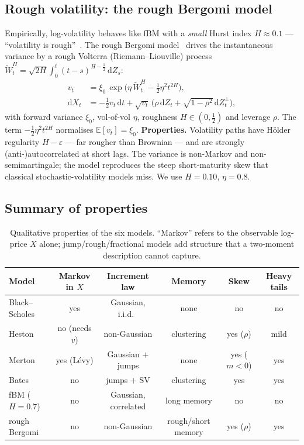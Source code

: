 \documentclass[11pt]{article}
\newcommand{\dd}{\mathrm{d}}
\newcommand{\E}{\mathbb{E}}
\begin{document}
\subsection{Rough volatility: the rough Bergomi model}
Empirically, log-volatility behaves like fBM with a \emph{small} Hurst index
$H\approx0.1$ --- ``volatility is rough''~\cite{GatheralJaissonRosenbaum2018}. The
rough Bergomi model~\cite{BayerFrizGatheral2016} drives the instantaneous variance
by a rough Volterra (Riemann--Liouville) process
$\widetilde W^{H}_t = \sqrt{2H}\int_0^t (t-s)^{H-\frac12}\,\dd Z_s$:
\begin{align}
  v_t &= \xi_0\,\exp\!\Big(\eta\,\widetilde W^{H}_t - \tfrac12\eta^2 t^{2H}\Big), \\
  \dd X_t &= -\tfrac12 v_t\,\dd t
             + \sqrt{v_t}\,\big(\rho\,\dd Z_t + \sqrt{1-\rho^2}\,\dd Z_t^{\perp}\big),
\end{align}
with forward variance $\xi_0$, vol-of-vol $\eta$, roughness $H\in(0,\tfrac12)$ and
leverage $\rho$. The term $-\tfrac12\eta^2 t^{2H}$ normalises $\E[v_t]=\xi_0$.
\textbf{Properties.} Volatility paths have H\"older regularity $H-\varepsilon$ ---
far rougher than Brownian --- and are strongly (anti-)autocorrelated at short lags.
The variance is non-Markov and non-semimartingale; the model reproduces the steep
short-maturity skew that classical stochastic-volatility models miss. We use
$H=0.10$, $\eta=0.8$.

\subsection{Summary of properties}
\begin{table}[H]
\centering
\caption{Qualitative properties of the six models. ``Markov'' refers to the
observable log-price $X$ alone; jump/rough/fractional models add structure that a
two-moment description cannot capture.}
\renewcommand{\arraystretch}{1.15}
\begin{tabular}{@{}lccccc@{}}
\toprule
Model & Markov in $X$ & Increment law & Memory & Skew & Heavy tails \\
\midrule
Black--Scholes & yes & Gaussian, i.i.d.\ & none & no & no \\
Heston         & no (needs $v$) & non-Gaussian & clustering & yes ($\rho$) & mild \\
Merton         & yes (L\'evy) & Gaussian $+$ jumps & none & yes ($m<0$) & yes \\
Bates          & no & jumps $+$ SV & clustering & yes & yes \\
fBM ($H{=}0.7$)& no & Gaussian, correlated & long memory & no & no \\
rough Bergomi  & no & non-Gaussian & rough/short memory & yes ($\rho$) & yes \\
\bottomrule
\end{tabular}
\end{table}
\end{document}
